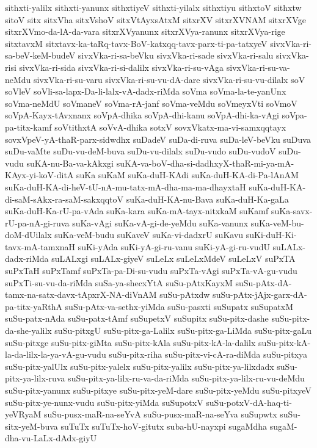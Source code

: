 {sithxti-yalilx
sithxti-yanunx
sithxtiyeV
sithxti-yilalx
sithxtiyu
sithxtoV
sithxtw
sitoV
sitx
sitxVha
sitxVshoV
sitxVtAyxsAtxM
sitxrXV
sitxrXVNAM
sitxrXVge
sitxrXVmo-da-lA-da-vara
sitxrXVyanunx
sitxrXVya-ranunx
sitxrXVya-rige
sitxtavxM
sitxtavx-ka-taRq-tavx-BoV-katxqq-tavx-parx-ti-pa-tatxyeV
sivxVka-ri-sa-beV-keM-budeV
sivxVka-ri-sa-beVku
sivxVka-ri-sade
sivxVka-ri-salu
sivxVka-risi
sivxVka-ri-sida
sivxVka-ri-si-dalilx
sivxVka-ri-su-vAga
sivxVka-ri-su-va-neMdu
sivxVka-ri-su-varu
sivxVka-ri-su-vu-dA-dare
sivxVka-ri-su-vu-dilalx
soV
soVleV
soVli-sa-lapx-Da-li-lalx-vA-dadx-riMda
soVma
soVma-la-te-yanUnx
soVma-neMdU
soVmaneV
soVma-rA-janf
soVma-veMdu
soVmeyxVti
soVmoV
soVpA-Kayx-tAvxnanx
soVpA-dhika
soVpA-dhi-kanu
soVpA-dhi-ka-vAgi
soVpa-pa-titx-kamf
soVtithxtA
soVvA-dhika
sotxV
sovxVkatx-ma-vi-samxqqtayx
sovxVpeV-yA-thaR-parx-sidwdhx
suDadeV
suDa-di-ruva
suDa-leV-beVku
suDuva
suDu-vaMte
suDu-vu-deM-buva
suDu-vu-dilalx
suDu-vudo
suDu-vudoV
suDu-vudu
suKA-nu-Ba-va-kAkxgi
suKA-va-boV-dha-si-dadhxyX-thaR-mi-ya-mA-KAyx-yi-koV-ditA
suKa
suKaM
suKa-duH-KAdi
suKa-duH-KA-di-Pa-lAnAM
suKa-duH-KA-di-heV-tU-nA-mu-tatx-mA-dha-ma-ma-dhayxtaH
suKa-duH-KA-di-saM-sAkx-ra-saM-sakxqqtoV
suKa-duH-KA-nu-Bava
suKa-duH-Ka-gaLa
suKa-duH-Ka-rU-pa-vAda
suKa-kara
suKa-mA-tayx-nitxkaM
suKamf
suKa-savx-rU-pa-nA-gi-ruva
suKa-vAgi
suKa-vA-gi-de-yeMdu
suKa-vanunx
suKa-veM-bu-doM-dUilalx
suKa-veM-budu
suKaveV
suKa-vi-dadxrU
suKavu
suKi-duH-Ki-tavx-mA-tamxnaH
suKi-yAda
suKi-yA-gi-ru-vanu
suKi-yA-gi-ru-vudU
suLALx-dadx-riMda
suLALxgi
suLALx-giyeV
suLeLx
suLeLxMdeV
suLeLxV
suPxTA
suPxTaH
suPxTamf
suPxTa-pa-Di-su-vudu
suPxTa-vAgi
suPxTa-vA-gu-vudu
suPxTi-su-vu-da-riMda
suSa-ya-shecxYtA
suSu-pAtxKayxM
suSu-pAtx-dA-tamx-na-satx-davx-tApxrX-NA-diVnAM
suSu-pAtxdw
suSu-pAtx-jAjx-garx-dA-pa-titx-yaRthA
suSu-pAtx-va-sethx-yiMda
suSu-pasxti
suSupatx
suSupatxM
suSu-patx-nAda
suSu-patx-tAmf
suSupetxV
suSupitx
suSu-pitx-dashe
suSu-pitx-da-she-yalilx
suSu-pitxgU
suSu-pitx-ga-Lalilx
suSu-pitx-ga-LiMda
suSu-pitx-gaLu
suSu-pitxge
suSu-pitx-giMta
suSu-pitx-kAla
suSu-pitx-kA-la-dalilx
suSu-pitx-kA-la-da-lilx-la-ya-vA-gu-vudu
suSu-pitx-riha
suSu-pitx-vi-cA-ra-diMda
suSu-pitxya
suSu-pitx-yalUlx
suSu-pitx-yalelx
suSu-pitx-yalilx
suSu-pitx-ya-lilxdadx
suSu-pitx-ya-lilx-ruva
suSu-pitx-ya-lilx-ru-va-da-riMda
suSu-pitx-ya-lilx-ru-vu-deMdu
suSu-pitx-yanunx
suSu-pitxye
suSu-pitx-yeM-dare
suSu-pitx-yeMdu
suSu-pitxyeV
suSu-pitx-ye-nunx-vudu
suSu-pitx-yiMda
suSupotxV
suSu-potxV-dA-haq-ti-yeVRyaM
suSu-pusx-maR-na-seYvA
suSu-pusx-maR-na-seYva
suSupwtx
suSu-sitx-yeM-buva
suTuTx
suTuTx-hoV-gitutx
suba-hU-nayxpi
sugaMdha
sugaM-dha-vu-LaLx-dAdx-giyU
}

